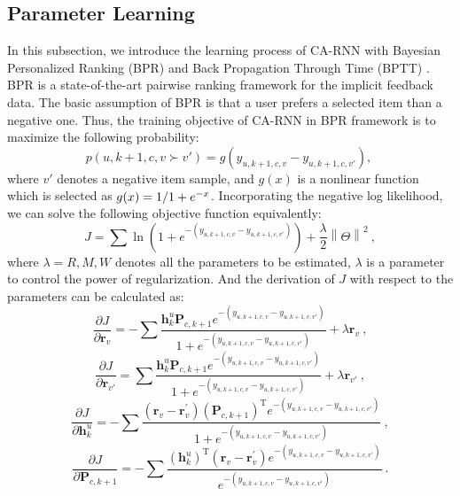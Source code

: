 \documentclass[conference]{IEEEtran}
\begin{document}
\subsection{Parameter Learning}

In this subsection, we introduce the learning process of CA-RNN with Bayesian Personalized Ranking (BPR) \cite{rendle2009bpr} and Back Propagation Through Time (BPTT) \cite{rumelhart1988learning}.
BPR is a state-of-the-art pairwise ranking framework for the implicit feedback data. The basic assumption of BPR is that a user prefers a selected item than a negative one. Thus, the training objective of CA-RNN in BPR framework is to maximize the following probability:
\begin{equation}
p(u, k+1, c, v\succ v') = g(y_{u, k+1, c, v} - y_{u, k+1, c, v'}),~
\end{equation}
where $v'$ denotes a negative item sample, and $g(x)$ is a nonlinear function which is selected as $g(x) = {1 \mathord{\left/ \right. \kern-\nulldelimiterspace} 1 + e^{ - x}}$. Incorporating the negative log likelihood, we can solve the following objective function equivalently:
\begin{equation}
J = \sum \ln(1+e^{-(y_{u,k+1,c,v} - y_{u,k+1,c,v'})})+\frac{\lambda }{2}\left \| \Theta  \right \|^{2}  ~,
\end{equation}
where $\lambda = {R, M ,W}$ denotes all the parameters to be estimated, $\lambda$ is a parameter to control the power of regularization. And the derivation of $J$ with respect to the parameters can be calculated as: 
\begin{displaymath}
\frac{\partial J}{\partial \mathbf{r}_{v}} = -\sum \frac{\mathbf{h}_{k}^{u}\mathbf{P}_{c,k+1}e^{-(y_{u, k+1, c, v} - y_{u, k+1, c, v'})}}{1+e^{-(y_{u, k+1, c, v} - y_{u, k+1, c, v'})}}+\lambda \mathbf{r}_{v}  ~,
\end{displaymath}
\begin{displaymath}
\frac{\partial J}{\partial \mathbf{r}_{v'}} = \sum \frac{\mathbf{h}_{k}^{u}\mathbf{P}_{c,k+1}e^{-(y_{u, k+1, c, v} - y_{u, k+1, c, v'})}}{1+e^{-(y_{u, k+1, c, v} - y_{u, k+1, c, v'})}}+\lambda \mathbf{r}_{v'}  ~,
\end{displaymath}
\begin{displaymath}
\frac{\partial J}{\partial \mathbf{h}_{k}^{u}} = -\sum \frac{(\mathbf{r}_{v}-\mathbf{r}_{v}^{'})(\mathbf{P}_{c,k+1})^{\mathrm{ T }}e^{-(y_{u, k+1, c, v} - y_{u, k+1, c, v'})}}{1+e^{-(y_{u, k+1, c, v} - y_{u, k+1, c, v'})}}   ~,
\end{displaymath}
\begin{displaymath}
\frac{\partial J}{\partial \mathbf{P}_{c,k+1}} = -\sum \frac{(\mathbf{h}_{k}^{u})^{\mathrm T}(\mathbf{r}_{v}-\mathbf{r}_{v}^{'})e^{-(y_{u, k+1, c, v} - y_{u, k+1, c, v'})}
}{e^{-(y_{u, k+1, c, v} - y_{u, k+1, c, v'})}}    ~.
\end{displaymath}
\end{document}
